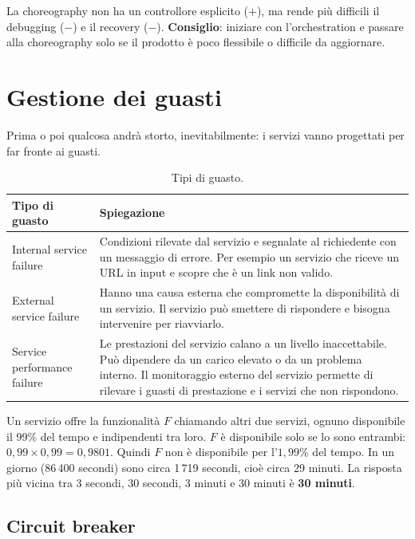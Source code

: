 La choreography non ha un controllore esplicito ($+$), ma rende più difficili il debugging ($-$) e il recovery ($-$).
\textbf{Consiglio}: iniziare con l'orchestration e passare alla choreography solo se il prodotto è poco flessibile o
difficile da aggiornare.

\section{Gestione dei guasti}
\label{sec:micro-guasti}

Prima o poi qualcosa andrà storto, inevitabilmente: i servizi vanno progettati per far fronte ai guasti.

\begin{table}[ht]
\centering
\small
\caption{Tipi di guasto.}
\label{tab:micro-guasti}
\begin{tabularx}{\linewidth}{>{\raggedright\arraybackslash}p{3.8cm}X}
\toprule
Tipo di guasto & Spiegazione \\
\midrule
Internal service failure & Condizioni rilevate dal servizio e segnalate al richiedente con un messaggio di errore. Per
  esempio un servizio che riceve un URL in input e scopre che è un link non valido. \\
External service failure & Hanno una causa esterna che compromette la disponibilità di un servizio. Il servizio può
  smettere di rispondere e bisogna intervenire per riavviarlo. \\
Service performance failure & Le prestazioni del servizio calano a un livello inaccettabile. Può dipendere da un carico
  elevato o da un problema interno. Il monitoraggio esterno del servizio permette di rilevare i guasti di prestazione e
  i servizi che non rispondono. \\
\bottomrule
\end{tabularx}
\end{table}

\begin{esempio}
Un servizio offre la funzionalità $F$ chiamando altri due servizi, ognuno disponibile il 99\% del tempo e indipendenti
tra loro. $F$ è disponibile solo se lo sono entrambi: $0{,}99 \times 0{,}99 = 0{,}9801$. Quindi $F$ non è disponibile per
l'$1{,}99\%$ del tempo. In un giorno (86\,400 secondi) sono circa 1\,719 secondi, cioè circa 29 minuti. La risposta
più vicina tra 3 secondi, 30 secondi, 3 minuti e 30 minuti è \textbf{30 minuti}.
\end{esempio}

\subsection{Circuit breaker}

